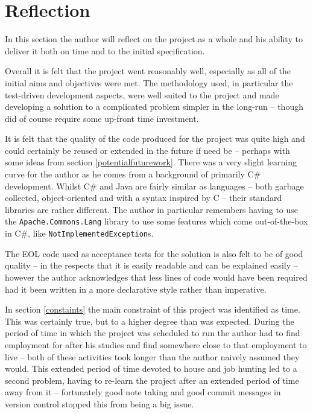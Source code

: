 \documentclass[11pt]{book}
\newcommand{\code}[1]{\texttt{#1}}
\begin{document}
\section{Reflection}
In this section the author will reflect on the project as a whole and his ability to deliver it both on time and to the initial specification.

Overall it is felt that the project went reasonably well, especially as all of the initial aims and objectives were met. The methodology used, in particular the test-driven development aspects, were well suited to the project and made developing a solution to a complicated problem simpler in the long-run -- though did of course require some up-front time investment.

It is felt that the quality of the code produced for the project was quite high and could certainly be reused or extended in the future if need be -- perhaps with some ideas from section \ref{potentialfuturework}. There was a very slight learning curve for the author as he comes from a background of primarily C\# development. Whilst C\# and Java are fairly similar as languages -- both garbage collected, object-oriented and with a syntax inspired by C -- their standard libraries are rather different. The author in particular remembers having to use the \code{Apache.Commons.Lang} library to use some features which come out-of-the-box in C\#, like \code{NotImplementedException}s.

The EOL code used as acceptance tests for the solution is also felt to be of good quality -- in the respects that it is easily readable and can be explained easily -- however the author acknowledges that less lines of code would have been required had it been written in a more declarative style rather than imperative. 

In section \ref{constaints} the main constraint of this project was identified as time. This was certainly true, but to a higher degree than was expected. During the period of time in which the project was scheduled to run the author had to find employment for after his studies and find somewhere close to that employment to live -- both of these activities took longer than the author naively assumed they would. This extended period of time devoted to house and job hunting led to a second problem, having to re-learn the project after an extended period of time away from it -- fortunately good note taking and good commit messages in version control stopped this from being a big issue. 
\end{document}
